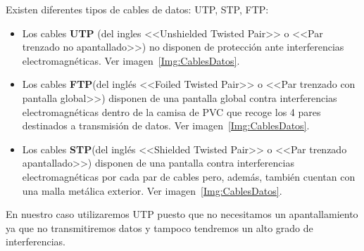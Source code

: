 Existen diferentes tipos de cables de datos: UTP, STP, FTP:
\begin{itemize}
\item Los cables \textbf{UTP} (del ingles <<Unshielded Twisted Pair>> o <<Par trenzado no apantallado>>) no disponen de protección ante interferencias electromagnéticas. Ver imagen~\ref{Img:CablesDatos}.



\item Los cables \textbf{FTP}(del inglés <<Foiled Twisted Pair>> o <<Par trenzado con pantalla global>>) disponen de una pantalla global contra interferencias electromagnéticas dentro de la camisa de PVC que recoge los 4 pares destinados a transmisión de datos. Ver imagen~\ref{Img:CablesDatos}.



\item Los cables \textbf{STP}(del inglés <<Shielded Twisted Pair>> o <<Par trenzado apantallado>>) disponen de una pantalla contra interferencias electromagnéticas por cada par de cables pero, además, también cuentan con una malla metálica exterior. Ver imagen~\ref{Img:CablesDatos}.


\end{itemize}
En nuestro caso utilizaremos UTP puesto que no necesitamos un apantallamiento ya que no transmitiremos datos y tampoco tendremos un alto grado de interferencias.
